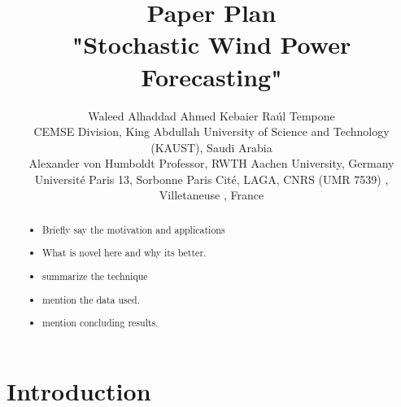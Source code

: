 \documentclass[10pt,twocolumn,letterpaper]{article}
\begin{document}
\title{Paper Plan  \\ "Stochastic Wind Power Forecasting"  }  %

\author{ Waleed Alhaddad\textsuperscript{\textasteriskcentered} \qquad Ahmed Kebaier\textsuperscript{\ddag} \qquad Ra\'ul  Tempone\textsuperscript{\textasteriskcentered}\textsuperscript{\textdagger} \\
\textsuperscript{\textasteriskcentered}CEMSE Division, King Abdullah University of Science and Technology (KAUST), Saudi Arabia \\ \textsuperscript{\textdagger}Alexander von Humboldt Professor, RWTH Aachen University,  Germany
 \\ \textsuperscript{\ddag}Université Paris 13, Sorbonne Paris Cité, LAGA, CNRS (UMR 7539) , Villetaneuse , France }

\maketitle


\begin{abstract}

\begin{itemize}
    \item Briefly say the motivation and applications
    \item What is novel here and why its better.
    \item summarize the technique
    \item mention the data used.
    \item mention concluding results.
\end{itemize}

\end{abstract}

\section{Introduction}
\end{document}
